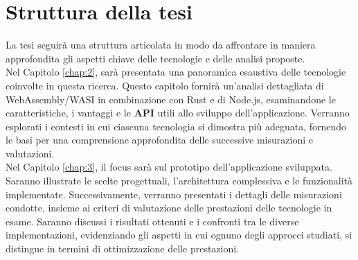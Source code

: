 \section{Struttura della tesi}
\label{sec:struttura}
La tesi seguirà una struttura articolata in modo da affrontare in maniera approfondita gli aspetti chiave delle tecnologie e delle analisi proposte.
\\Nel Capitolo \ref{chap:2}, sarà presentata una panoramica esaustiva delle tecnologie coinvolte in questa ricerca. Questo capitolo fornirà un'analisi dettagliata di WebAssembly/WASI in combinazione con Rust e di Node.js, esaminandone le caratteristiche, i vantaggi e le \textbf{API} utili allo sviluppo dell'applicazione.
Verranno esplorati i contesti in cui ciascuna tecnologia si dimostra più adeguata, fornendo le basi per una comprensione approfondita delle successive misurazioni e valutazioni.
\\Nel Capitolo \ref{chap:3}, il focus sarà sul prototipo dell'applicazione sviluppata. Saranno illustrate le scelte progettuali, l'architettura complessiva e le funzionalità implementate.
Successivamente, verranno presentati i dettagli delle misurazioni condotte, insieme ai criteri di valutazione delle prestazioni delle tecnologie in esame. 
Saranno discussi i risultati ottenuti e i confronti tra le diverse implementazioni, evidenziando gli aspetti in cui ognuno degli approcci studiati, si distingue in termini di ottimizzazione delle prestazioni.

